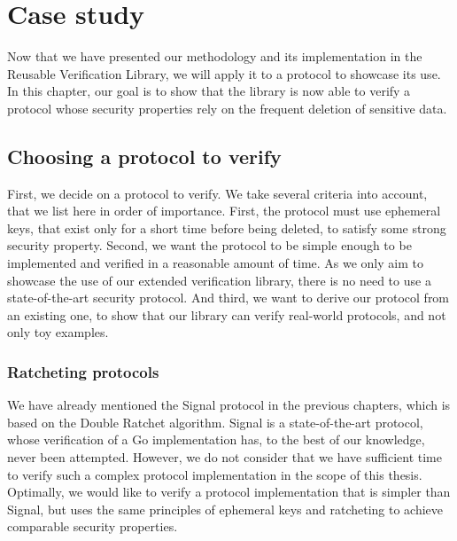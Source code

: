 
\chapter{Case study}

Now that we have presented our methodology and its implementation in the Reusable Verification Library, we will apply it to a protocol to showcase its use. 
In this chapter, our goal is to show that the library is now able to verify a protocol whose security properties rely on the frequent deletion of sensitive data.


\section{Choosing a protocol to verify}

First, we decide on a protocol to verify.
We take several criteria into account, that we list here in order of importance.
First, the protocol must use ephemeral keys, that exist only for a short time before being deleted, to satisfy some strong security property.
Second, we want the protocol to be simple enough to be implemented and verified in a reasonable amount of time. As we only aim to showcase the use of our extended verification library, there is no need to use a state-of-the-art security protocol.
And third, we want to derive our protocol from an existing one, to show that our library can verify real-world protocols, and not only toy examples.


\subsection{Ratcheting protocols}

We have already mentioned the Signal protocol in the previous chapters, which is based on the Double Ratchet algorithm.
Signal is a state-of-the-art protocol, whose verification of a Go implementation has, to the best of our knowledge, never been attempted.
However, we do not consider that we have sufficient time to verify such a complex protocol implementation in the scope of this thesis.
Optimally, we would like to verify a protocol implementation that is simpler than Signal, but uses the same principles of ephemeral keys and ratcheting to achieve comparable security properties.

